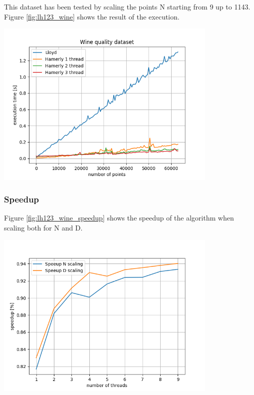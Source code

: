 \documentclass{report}
\begin{document}
\begin{minipage}[b]{0.48\textwidth}
  This dataset has been tested by scaling the points N starting from 9 up to 1143. Figure \ref{fig:lh123_wine} shows the result of the execution.

  \begin{center} 
    \includegraphics[width = 0.8\textwidth]{imgs/lh123_wine.png}
    \label{fig:lh123_wine}
  \end{center}

  \subsubsection*{Speedup}
  Figure \ref{fig:lh123_wine_speedup} shows the speedup of the algorithm when scaling both for N and D.
  \begin{center} 
    \includegraphics[width = 0.8\textwidth]{imgs/lh123_wine_speedup.png}
    \label{fig:lh123_wine_speedup}
  \end{center}


\end{minipage}
\end{document}
